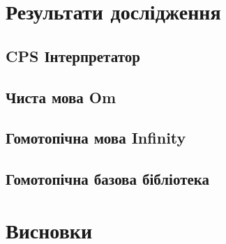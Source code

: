 \documentclass{article}
\begin{document}
\section{Результати дослідження}

\subsection{CPS Інтерпретатор}

\subsection{Чиста мова Om}

\subsection{Гомотопічна мова Infinity}

\subsection{Гомотопічна базова бібліотека}

\section{Висновки}



\end{document}
